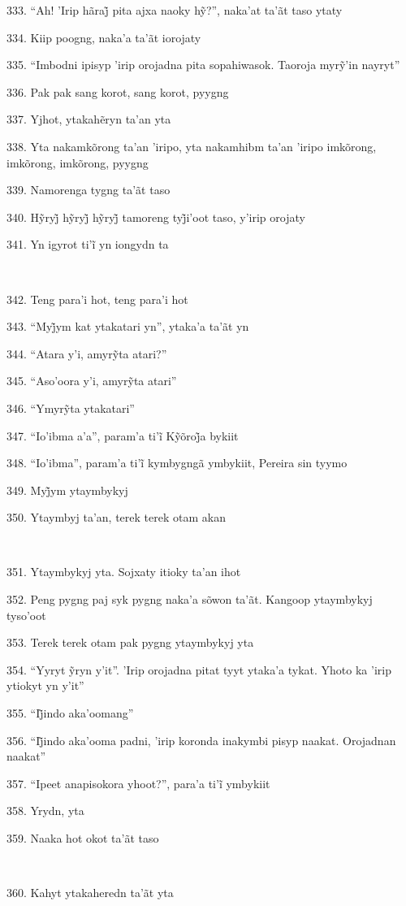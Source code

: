 333. “Ah! ’Irip hãraj̃ pita ajxa naoky hỹ?”, naka’at ta’ãt taso ytaty

334. Kiip poogng, naka'a ta'ãt iorojaty

335. “Imbodni ipisyp ’irip orojadna pita sopahiwasok. Taoroja myrỹ’in nayryt”

336. Pak pak sang korot, sang korot, pyygng

337. Yjhot, ytakahẽryn ta’an yta

338. Yta nakamkõrong ta'an 'iripo, yta nakamhibm ta'an 'iripo imkõrong,
imkõrong, imkõrong, pyygng

339. Namorenga tygng ta'ãt taso

340. Hỹryj̃ hỹryj̃ hỹryj̃ tamoreng tyj̃i’oot taso, y’irip orojaty

341. Yn igyrot ti’ĩ yn iongydn ta

~

342. Teng para'i hot, teng para'i hot

343. “Myj̃ym kat ytakatari yn”, ytaka’a ta’ãt yn

344. “Atara y’i, amyrỹta atari?”

345. “Aso’oora y’i, amyrỹta atari”

346. “Ymyrỹta ytakatari”

347. “Io’ibma a’a”, param’a ti’ĩ Kỹõroj̃a bykiit

348. “Io’ibma”, param’a ti’ĩ kymbygngã ymbykiit, Pereira sin tyymo

349. Myj̃ym ytaymbykyj

350. Ytaymbyj ta'an, terek terek otam akan

~

351. Ytaymbykyj yta. Sojxaty itioky ta'an ihot

352. Peng pygng paj syk pygng naka'a sõwon ta'ãt. Kangoop ytaymbykyj tyso'oot

353. Terek terek otam pak pygng ytaymbykyj yta

354. “Yyryt ỹryn y’it”. ’Irip orojadna pitat tyyt ytaka’a tykat. Yhoto ka ’irip ytiokyt yn y’it”

355. “Ij̃indo aka’oomang”

356. “Ij̃indo aka’ooma padni, ’irip koronda inakymbi pisyp naakat. Orojadnan naakat”

357. “Ipeet anapisokora yhoot?”, para’a ti’ĩ ymbykiit

358. Yrydn, yta

359. Naaka hot okot ta'ãt taso

~

360. Kahyt ytakaheredn ta'ãt yta

